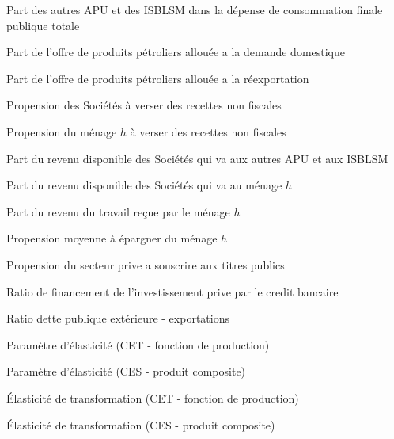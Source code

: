 \documentclass[11pt,a4paper]{article}
\newcommand{\trj}{\mathit{trj}}
\newcommand{\ntyh}{\mathit{ntyh}}
\newcommand{\ntyf}{\mathit{ntyf}}
\newcommand{\firm}{\mathsf{firm}}
\newcommand{\ngo}{\mathsf{ngo}}
\newcommand{\CG}{\mathit{CG}}
\newcommand{\EX}{\mathit{EX}}
\newcommand{\TRA}{\mathit{TRA}}
\newcommand{\BG}{\mathit{BG}}
\newcommand{\DCP}{\mathit{DCP}}
\begin{document}
\begin{description}[leftmargin=!,labelwidth=\widthof{\bfseries AAAAA},parsep=10pt]
		\item[$\mu^{\CG}$]   Part des autres APU et des ISBLSM dans la dépense de consommation finale publique totale
		
		\item[$\mu^D$] Part de l'offre de produits pétroliers allouée a la demande domestique
		
		\item[$\mu^E$] Part de l'offre de produits pétroliers allouée a la réexportation
		
		\item[$\ntyf$] Propension des Sociétés à verser des recettes non fiscales
		
		\item[$\ntyh_h$] Propension du ménage $h$ à verser des recettes non fiscales
		
		\item[$\lambda^{\TRA}_{\ngo,\firm}$]   Part du revenu disponible des Sociétés qui va aux autres APU et aux ISBLSM
		
		\item[$\lambda^{\TRA}_{h,\firm}$]   Part du revenu disponible des Sociétés qui va au ménage $h$
		
		\item[$\phi_h$] Part du revenu du travail reçue par le ménage $h$
		
		\item[$\psi_h$] Propension moyenne à épargner du ménage $h$
		
		\item[$\psi^{\BG}$] Propension du secteur prive a souscrire aux titres publics
		
		\item[$\psi^{\DCP}$]          Ratio de financement de l'investissement prive par le credit bancaire
		
		\item[$\psi^{\EX}$]             Ratio dette publique extérieure - exportations
		
		\item[$\rho_{\trj}^E$] Paramètre d'élasticité (CET - fonction de production)
		
		\item[$\rho_{\trj}^M$] Paramètre d'élasticité (CES - produit composite)
		
		\item[$\sigma_{\trj}^E$] Élasticité de transformation (CET - fonction de production)
		
		\item[$\sigma_{\trj}^M$] Élasticité de transformation (CES - produit composite)
		

\end{description}
\end{document}
